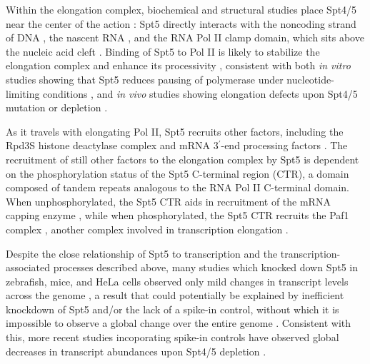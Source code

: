 Within the elongation complex, biochemical and structural studies place Spt4/5 near the center of the action \citep{vos2018a, vos2018b, ehara2017, ehara2019}: Spt5 directly interacts with the noncoding strand of DNA \citep{crickard2016,meyer2015}, the nascent RNA \citep{blythe2016, crickard2016,meyer2015}, and the RNA Pol II clamp domain, which sits above the nucleic acid cleft \citep{hirtreiter2010, martinez-rucobo2011, viktorovskaya2011, yamaguchi1999}.
Binding of Spt5 to Pol II is likely to stabilize the elongation complex and enhance its processivity \citep{hirtreiter2010,klein2011,martinez-rucobo2011,baluapuri2019}, consistent with both \textit{in vitro} studies showing that Spt5 reduces pausing of polymerase under nucleotide-limiting conditions \citep{guo2000,wada1998,zhu2007}, and \textit{in vivo} studies showing elongation defects upon Spt4/5 mutation or depletion \citep{diamant2016,kramer2016,liu2012,mason2005,morillon2003,quan2010,rondon2003}.

As it travels with elongating Pol II, Spt5 recruits other factors, including the Rpd3S histone deactylase complex \citep{drouin2010} and mRNA 3$^\prime$-end processing factors \citep{mayer2012, stadelmayer2014, yamamoto2014}.
The recruitment of still other factors to the elongation complex by Spt5 is dependent on the phosphorylation status of the Spt5 C-terminal region (CTR), a domain composed of tandem repeats analogous to the RNA Pol II C-terminal domain.
When unphosphorylated, the Spt5 CTR aids in recruitment of the mRNA capping enzyme \citep{doamekpor2014, doamekpor2015, schneider2010, wen1999}, while when phosphorylated, the Spt5 CTR recruits the Paf1 complex \citep{liu2009, mbogning2013, wier2013, zhou2009}, another complex involved in transcription elongation \citep{vanoss2017}.

Despite the close relationship of Spt5 to transcription and the transcription-associated processes described above, many studies which knocked down Spt5 in zebrafish, mice, and HeLa cells observed only mild changes in transcript levels across the genome \citep{diamant2016b, komori2009, krishnan2008, stanlie2012, fitz2018}, a result that could potentially be explained by inefficient knockdown of Spt5 and/or the lack of a spike-in control, without which it is impossible to observe a global change over the entire genome \citep{chen2016}.
Consistent with this, more recent studies incoporating spike-in controls have observed global decreases in transcript abundances upon Spt4/5 depletion \citep{henriques2018, naguib2019}.

